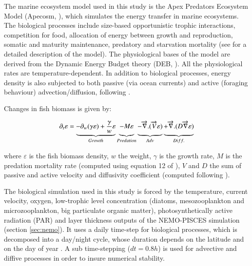The marine ecosystem model used in this study is the Apex Predators Ecosystem Model (Apecosm, \citealt{mauryModelingEnvironmentalEffects2007, mauryOverviewAPECOSMSpatialized2010}), which simulates the energy transfer in marine ecosystems. The biological processes include size-based opportunistic trophic interactions, competition for food, allocation of energy between growth and reproduction, somatic and maturity maintenance, predatory and starvation mortality (see \citealt{mauryModelingEnvironmentalEffects2007} for a detailed description of the model). The physiological bases of the model are derived from the Dynamic Energy Budget theory (DEB, \citealt{kooijmanDynamicEnergyMass2000}). All the physiological rates are temperature-dependent. In addition to biological processes, energy density is also subjected to both passive (via ocean currents) and active (foraging behaviour) advection/diffusion, following \cite{faugerasAdvectiondiffusionreactionSizestructuredFish2005}.

Changes in fish biomass is given by:

\begin{equation}
\partial_t \varepsilon = \underbrace{- \partial_w(\gamma \varepsilon) + \frac{\gamma}{w}\varepsilon}_{Growth} 
\underbrace{- M \varepsilon \vphantom{\frac{\gamma}{w}\varepsilon}}_{Predation}
\underbrace{-\overrightarrow{\nabla}.(\overrightarrow{V} \varepsilon) \vphantom{\frac{\gamma}{w}\varepsilon}}_{Adv} 
\underbrace{+ \overrightarrow{\nabla} . (D \overrightarrow{\nabla} \varepsilon) \vphantom{\frac{\gamma}{w}\varepsilon}}_{Diff.}
\label{eq:growth}
\end{equation}

where $\varepsilon$  is the fish biomass density, $w$ the weight, $\gamma$ is the growth rate, $M$ is the predation mortality rate (computed using equation 12 of \citealt{mauryIndividualsPopulationsCommunities2013}), $V$ and $D$ the sum of passive and active velocity and diffusivity coefficient (computed following \citealt{faugerasAdvectiondiffusionreactionSizestructuredFish2005}).

The biological simulation used in this study is forced by the temperature, current velocity, oxygen, low-trophic level concentration (diatoms, mesozooplankton and microzooplankton, big particulate organic matter), photosynthetically active radiation (PAR) and layer thickness outputs of the NEMO-PISCES simulation (section \ref{sec:nemo}). It uses a daily time-step for biological processes, which is decomposed into a day/night cycle, whose duration depends on the latitude and on the day of year \citep{forsytheModelComparisonDaylength1995}. A sub time-stepping ($dt =0.8h$) is used for advective and diffive processes in order to insure numerical stability.

